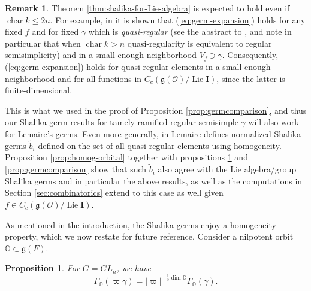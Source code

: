 \documentclass{amsart}
\numberwithin{equation}{section}
\newtheorem{proposition}[lemma]{Proposition}%
\theoremstyle{definition}
\newtheorem{remark}[lemma]{Remark}%
\def\tilde{\widetilde}
\DeclareMathOperator{\Lie}{Lie}
\newcommand{\cO}{\mathcal{O}}
\newcommand{\fg}{\mathfrak{g}}
\newcommand{\bI}{\mathbf{I}}
\DeclareMathOperator{\cchar}{\text{char}}
\begin{document}
\begin{remark} Theorem \ref{thm:shalika-for-Lie-algebra} is expected to hold even if $\cchar k\leq 2n$. For example, in \cite[\S5]{Lemaire} it is shown that (\ref{eq:germ-expansion}) holds for any fixed $f$ and for fixed $\gamma$ which is {\em quasi-regular} (see the abstract to \cite{Lemaire}, and note in particular that when $\cchar k>n$ quasi-regularity is equivalent to regular semisimplicity) and in a small enough neighborhood $V_f\ni \gamma$. Consequently, (\ref{eq:germ-expansion}) holds for quasi-regular elements in a small enough neighborhood and for all functions in $C_c(\fg(\cO)/\Lie \bI)$, since the latter is finite-dimensional. 

This is what we used in the proof of Proposition \ref{prop:germcomparison}, and thus our Shalika germ results for tamely ramified regular semisimple $\gamma$ will also work for Lemaire's germs. Even more generally, in \cite[\S5.2, pp. 505]{Lemaire} Lemaire defines normalized Shalika germs $\tilde{b}_i$ defined on the set of all quasi-regular elements using homogeneity. Proposition \ref{prop:homog-orbital} together with propositions \ref{prop:homogeneity} and \ref{prop:germcomparison} show that such $\tilde{b}_i$ also agree with the Lie algebra/group Shalika germs and in particular the above results, as well as the computations in Section \ref{sec:combinatorics} extend to this case as well given $f\in C_c(\fg(\cO)/\Lie \bI)$.
\end{remark}





As mentioned in the introduction, the Shalika germs enjoy a homogeneity property, which we now restate for future reference. Consider a nilpotent orbit $\mathbb{O}\subset\fg(F)$.
\begin{proposition}
\label{prop:homogeneity}
For $G=GL_n$, we have 
$$\Gamma_{\mathbb{O}}(\varpi\gamma)=|\varpi|^{-\frac{1}{2}\dim \mathbb{O}}\Gamma_\mathbb{O}(\gamma).$$
\end{proposition}
\end{document}

